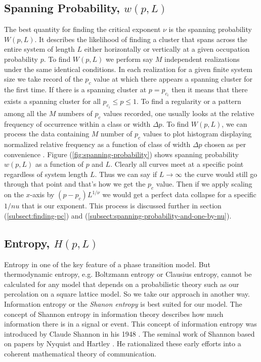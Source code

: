 	\subsection{Spanning Probability, $w(p,L)$}
	\label{subsect:spanning-probability}
	The best quantity for finding the critical exponent $\nu$	is the spanning probability $W(p,L)$. It describes the likelihood of finding a cluster that spans across the entire system of length $L$ either horizontally or vertically at a given occupation probability $p$. To find $W(p,L)$ we perform say $M$ independent realizations under the same identical conditions. In each realization for a given finite system size	we take record of the $p_c$ value at which there appears a	spanning cluster for the first time. If there is a spanning	cluster at $p=p_{c_i}$ then it means that there exists a spanning cluster for all $p_{c_i} \leq p \leq 1$. To find a regularity or a	pattern among all the $M$ numbers of $p_c$ values recorded,	one usually looks at the relative frequency of occurrence	within a class or width $\Delta p$. To find $W(p,L)$, we can process the data containing $M$ number of $p_c$ values to plot	histogram displaying normalized relative frequency as a	function of class of width $\Delta p$ chosen as per convenience	\cite{redefinition-of-site-percolation}. Figure (\ref{fig:spanning-probability}) shows spanning probability $w(p,L)$ as a function of $p$ and $L$. Clearly all curves meet at a specific point regardless of system length $L$. Thus we can say if $L \rightarrow \infty$ the curve would still go through that point and that's how we get the $p_c$ value. Then if we apply scaling on the $x$-axis by $(p-p_c)L^{1/\nu}$ we would get a perfect data collapse for a specific $1/nu$ that is our exponent. This process is discussed further in section (\ref{subsect:finding-pc}) and (\ref{subsect:spanning-probability-and-one-by-nu}).



	\subsection{Entropy, $H(p,L)$} 
	\label{subsect:percolation-entropy}
	Entropy in one of the key feature of a phase transition model. But thermodynamic entropy, e.g. Boltzmann entropy or Clausius entropy, cannot be calculated for any model that depends on a probabilistic theory such as our percolation on a square lattice model. So we take our approach in another way. Information entropy or the \textit{Shanon entropy} is best suited for our model. The	concept of Shannon entropy in information theory describes how much information there is in	a signal or event. This concept of information entropy was introduced by Claude Shannon in his 1948 \cite{Shannon1948}. The seminal work of Shannon based on papers by	Nyquist \cite{Nyquist1924, Nyquist2002} and Hartley \cite{Hartley1928}. He rationalized these early efforts into a coherent mathematical	theory of communication.
	
